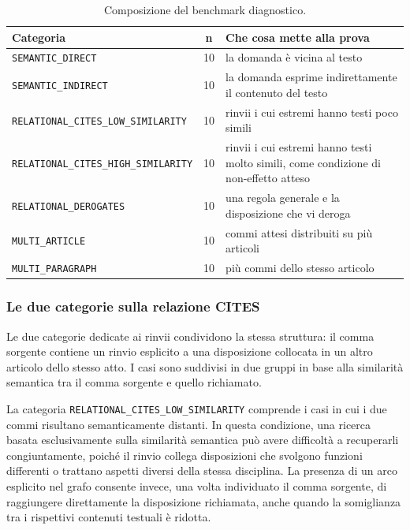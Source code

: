 \begin{table}[H]
    \centering
    \renewcommand{\arraystretch}{1.2}
    \begin{tabular}{|l|c|p{5.2cm}|}
        \hline
        \textbf{Categoria} & \textbf{n} & \textbf{Che cosa mette alla prova} \\
        \hline\hline
        \texttt{SEMANTIC\_DIRECT} & 10 & la domanda è vicina al testo \\
        \hline
        \texttt{SEMANTIC\_INDIRECT} & 10 & la domanda esprime indirettamente il contenuto del testo \\
        \hline
        \texttt{RELATIONAL\_CITES\_LOW\_SIMILARITY} & 10 & rinvii i cui estremi hanno testi poco simili \\
        \hline
        \texttt{RELATIONAL\_CITES\_HIGH\_SIMILARITY} & 10 & rinvii i cui estremi hanno testi molto simili, come condizione di non-effetto atteso \\
        \hline
        \texttt{RELATIONAL\_DEROGATES} & 10 & una regola generale e la disposizione che vi deroga \\
        \hline
        \texttt{MULTI\_ARTICLE} & 10 & commi attesi distribuiti su più articoli \\
        \hline
        \texttt{MULTI\_PARAGRAPH} & 10  & più commi dello stesso articolo \\
        \hline
    \end{tabular}
    \caption{Composizione del benchmark diagnostico.}
    \label{tab:composizione_banco}
\end{table}


\subsubsection{Le due categorie sulla relazione CITES}

Le due categorie dedicate ai rinvii condividono la stessa struttura: il comma sorgente contiene un rinvio esplicito a una disposizione collocata in un altro articolo dello stesso atto. I casi sono suddivisi in due gruppi in base alla similarità semantica tra il comma sorgente e quello richiamato.

La categoria \texttt{RELATIONAL\_CITES\_LOW\_SIMILARITY} comprende i casi in cui i due commi risultano semanticamente distanti. In questa condizione, una ricerca basata esclusivamente sulla similarità semantica può avere difficoltà a recuperarli congiuntamente, poiché il rinvio collega disposizioni che svolgono funzioni differenti o trattano aspetti diversi della stessa disciplina. La presenza di un arco esplicito nel grafo consente invece, una volta individuato il comma sorgente, di raggiungere direttamente la disposizione richiamata, anche quando la somiglianza tra i rispettivi contenuti testuali è ridotta.

